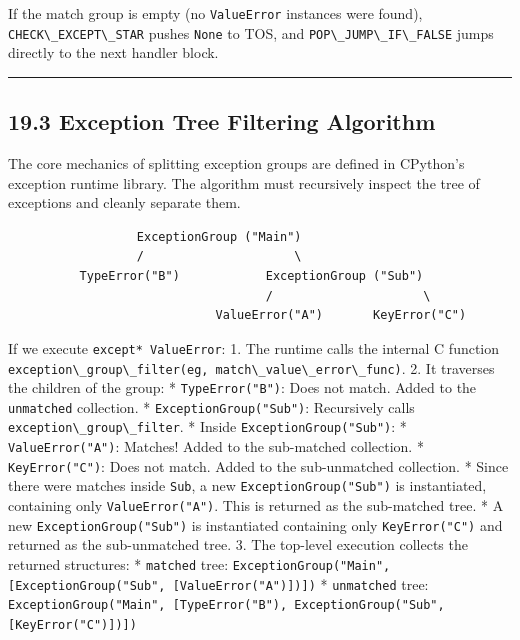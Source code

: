 If the match group is empty (no \passthrough{\lstinline!ValueError!}
instances were found), \passthrough{\lstinline!CHECK\_EXCEPT\_STAR!}
pushes \passthrough{\lstinline!None!} to TOS, and
\passthrough{\lstinline!POP\_JUMP\_IF\_FALSE!} jumps directly to the
next handler block.

\begin{center}\rule{0.5\linewidth}{0.5pt}\end{center}

\hypertarget{exception-tree-filtering-algorithm}{%
\subsection{19.3 Exception Tree Filtering
Algorithm}\label{exception-tree-filtering-algorithm}}

The core mechanics of splitting exception groups are defined in
CPython's exception runtime library. The algorithm must recursively
inspect the tree of exceptions and cleanly separate them.

\begin{lstlisting}
                  ExceptionGroup ("Main")
                  /                     \
          TypeError("B")            ExceptionGroup ("Sub")
                                    /                     \
                             ValueError("A")       KeyError("C")
\end{lstlisting}

If we execute \passthrough{\lstinline!except* ValueError!}: 1. The
runtime calls the internal C function
\passthrough{\lstinline!exception\_group\_filter(eg, match\_value\_error\_func)!}.
2. It traverses the children of the group: *
\passthrough{\lstinline!TypeError("B")!}: Does not match. Added to the
\passthrough{\lstinline!unmatched!} collection. *
\passthrough{\lstinline!ExceptionGroup("Sub")!}: Recursively calls
\passthrough{\lstinline!exception\_group\_filter!}. * Inside
\passthrough{\lstinline!ExceptionGroup("Sub")!}: *
\passthrough{\lstinline!ValueError("A")!}: Matches! Added to the
sub-matched collection. * \passthrough{\lstinline!KeyError("C")!}: Does
not match. Added to the sub-unmatched collection. * Since there were
matches inside \passthrough{\lstinline!Sub!}, a new
\passthrough{\lstinline!ExceptionGroup("Sub")!} is instantiated,
containing only \passthrough{\lstinline!ValueError("A")!}. This is
returned as the sub-matched tree. * A new
\passthrough{\lstinline!ExceptionGroup("Sub")!} is instantiated
containing only \passthrough{\lstinline!KeyError("C")!} and returned as
the sub-unmatched tree. 3. The top-level execution collects the returned
structures: * \passthrough{\lstinline!matched!} tree:
\passthrough{\lstinline!ExceptionGroup("Main", [ExceptionGroup("Sub", [ValueError("A")])])!}
* \passthrough{\lstinline!unmatched!} tree:
\passthrough{\lstinline!ExceptionGroup("Main", [TypeError("B"), ExceptionGroup("Sub", [KeyError("C")])])!}


